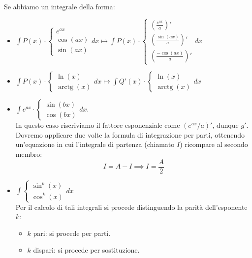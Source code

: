 \documentclass[12pt]{report}
\begin{document}
	Se abbiamo un integrale della forma:
	\begin{itemize}
		
		\item $\int P(x) \cdot \begin{cases} e^{ax} \\ \cos(ax) \\ \sin(ax) \end{cases} dx \longmapsto \int P(x) \cdot \begin{cases} (\frac{e^{ax}}{a})' \\ (\frac{\sin(ax)}{a})' \\ (\frac{-\cos(ax)}{a})' \end{cases} dx$
		
		\item $\int P(x) \cdot \begin{cases} \ln(x) \\ \operatorname{arctg}(x) \end{cases} dx \longmapsto \int Q'(x) \cdot \begin{cases} \ln(x) \\ \operatorname{arctg}(x) \end{cases} dx$
		
		\item $\int e^{ax} \cdot \begin{cases} \sin(bx) \\ \cos(bx) \end{cases} dx$.\\
		In questo caso riscriviamo il fattore esponenziale come $(e^{ax}/a)'$, dunque $g'$. Dovremo applicare due volte la formula di integrazione per parti, ottenendo un'equazione in cui l'integrale di partenza (chiamato $I$) ricompare al secondo membro:
		\[
		I = A - I \implies I = \frac{A}{2}
		\]
		
		\item $\int \begin{cases} \sin^k(x) \\ \cos^k(x) \end{cases} dx$\\
		Per il calcolo di tali integrali si procede distinguendo la parità dell'esponente $k$:
		\begin{itemize}
			
			\item $k$ pari: si procede per parti.
			
			\item $k$ dispari: si procede per sostituzione.
			
		\end{itemize}
		
	\end{itemize}
	
\end{document}
